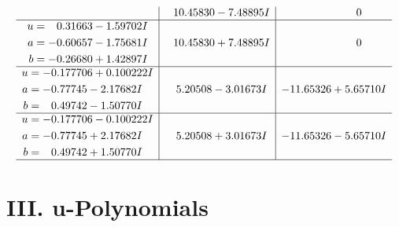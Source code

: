 \documentclass[1p]{elsarticle_modified}
\theoremstyle{definition}
\begin{document}
$$\begin{array}{c|c|c}
 & \phantom{-}10.45830 - 7.48895 I & \phantom{-0.000000 } 0 \\ \hline\begin{aligned}
u &= \phantom{-}0.31663 - 1.59702 I \\
a &= -0.60657 - 1.75681 I \\
b &= -0.26680 + 1.42897 I\end{aligned}
 & \phantom{-}10.45830 + 7.48895 I & \phantom{-0.000000 } 0 \\ \hline\begin{aligned}
u &= -0.177706 + 0.100222 I \\
a &= -0.77745 - 2.17682 I \\
b &= \phantom{-}0.49742 - 1.50770 I\end{aligned}
 & \phantom{-}5.20508 - 3.01673 I & -11.65326 + 5.65710 I \\ \hline\begin{aligned}
u &= -0.177706 - 0.100222 I \\
a &= -0.77745 + 2.17682 I \\
b &= \phantom{-}0.49742 + 1.50770 I\end{aligned}
 & \phantom{-}5.20508 + 3.01673 I & -11.65326 - 5.65710 I\\
 \hline 
 \end{array}$$\newpage
\newpage\renewcommand{\arraystretch}{1}
\centering \section*{ III. u-Polynomials}
\end{document}
